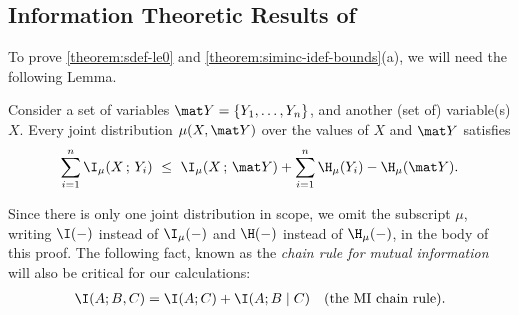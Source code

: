 \begin{subappendices}
\subsection{Information Theoretic Results of }
To prove \cref{theorem:sdef-le0} and \cref{theorem:siminc-idef-bounds}(a), we will need the following Lemma. 

\begin{lemma}
        \label{lem:Y-filter}
    Consider a set of variables $\mat Y = \{Y_1, \ldots, Y_n\}$, and another (set of) variable(s) $X$.
    Every joint distribution $\mu(X, \mat Y)$ over the values of $X$ and $\mat Y$ satisfies
    \[
        \sum_{i=1}^n \I_\mu(X \,;\, Y_i) 
        ~\le~
         \I_{\mu}(X \,;\, \mat Y) 
         + \sum_{i=1}^n \H_\mu(Y_i) - \H_\mu(\mat Y).
    \]
\end{lemma}
\begin{lproof}
Since there is only one joint distribution in scope, we omit the subscript $\mu$, writing $\I(-)$ instead of $\I_\mu(-)$ and $\H(-)$ instead of $\H_\mu(-)$, in the body of this proof.
The following fact, known as the \emph{chain rule for mutual information} will also be critical for our calculations:
    \begin{align}
        \I(A; B, C) &= \I(A; C) + \I(A; B \mid C)
            &\text{(the MI chain rule).}
            \label{eq:chain-rule-mi}
    \end{align}
    
    

\end{lproof}
\end{subappendices}
